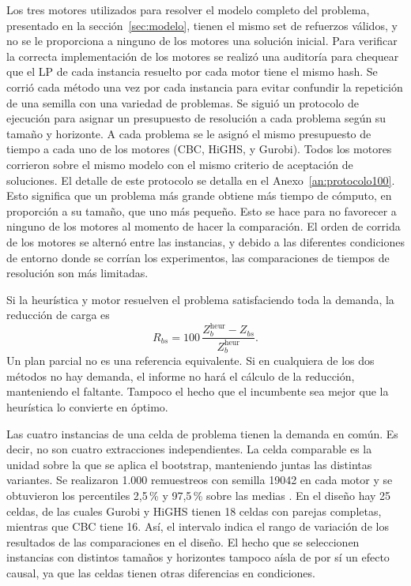 Los tres motores utilizados para resolver el modelo completo del problema, presentado en la sección~\ref{sec:modelo}, tienen el mismo set de refuerzos válidos, y no se le proporciona a ninguno de los motores una solución inicial. Para verificar la correcta implementación de los motores se realizó una auditoría para chequear que el LP de cada instancia resuelto por cada motor tiene el mismo hash. Se corrió cada método una vez por cada instancia para evitar confundir la repetición de una semilla con una variedad de problemas. Se siguió un protocolo de ejecución para asignar un presupuesto de resolución a cada problema según su tamaño y horizonte. A cada problema se le asignó el mismo presupuesto de tiempo a cada uno de los motores (CBC, HiGHS, y Gurobi). Todos los motores corrieron sobre el mismo modelo con el mismo criterio de aceptación de soluciones. El detalle de este protocolo se detalla en el Anexo~\ref{an:protocolo100}. Esto significa que un problema más grande obtiene más tiempo de cómputo, en proporción a su tamaño, que uno más pequeño. Esto se hace para no favorecer a ninguno de los motores al momento de hacer la comparación. El orden de corrida de los motores se alternó entre las instancias, y debido a las diferentes condiciones de entorno donde se corrían los experimentos, las comparaciones de tiempos de resolución son más limitadas.

Si la heurística y motor resuelven el problema satisfaciendo toda la demanda, la reducción de carga es
\begin{equation}
R_{bs}=100\,\frac{Z_b^{\mathrm{heur}}-Z_{bs}}{Z_b^{\mathrm{heur}}}.
\label{eq:mejora100}
\end{equation}
Un plan parcial no es una referencia equivalente. Si en cualquiera de los dos métodos no hay demanda, el informe no hará el cálculo de la reducción, manteniendo el faltante. Tampoco el hecho que el incumbente sea mejor que la heurística lo convierte en óptimo.

Las cuatro instancias de una celda de problema tienen la demanda en común. Es decir, no son cuatro extracciones independientes. La celda comparable es la unidad sobre la que se aplica el bootstrap, manteniendo juntas las distintas variantes. Se realizaron 1.000 remuestreos con semilla 19042 en cada motor y se obtuvieron los percentiles 2,5\,\% y 97,5\,\% sobre las medias \cite{davison1997}. En el diseño hay 25 celdas, de las cuales Gurobi y HiGHS tienen 18 celdas con parejas completas, mientras que CBC tiene 16. Así, el intervalo indica el rango de variación de los resultados de las comparaciones en el diseño. El hecho que se seleccionen instancias con distintos tamaños y horizontes tampoco aísla de por sí un efecto causal, ya que las celdas tienen otras diferencias en condiciones.

